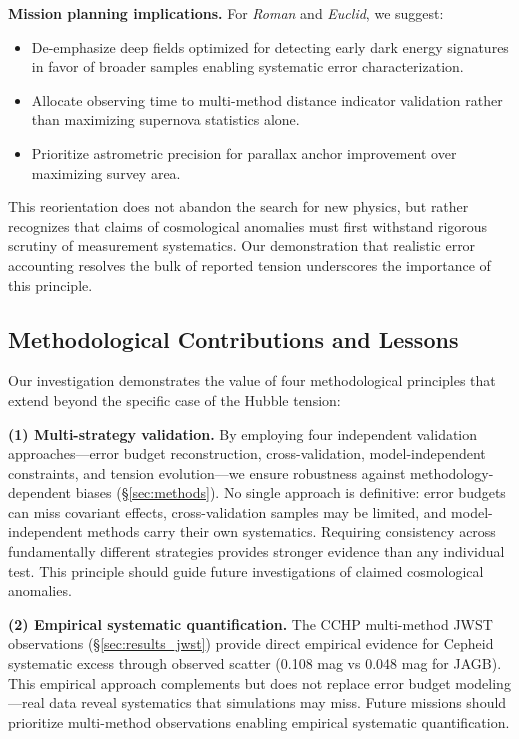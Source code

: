 \documentclass[twocolumn, linenumbers]{aastex701}
\begin{document}
\textbf{Mission planning implications.} For \textit{Roman} and \textit{Euclid}, we suggest:
\begin{itemize}
\item De-emphasize deep fields optimized for detecting early dark energy signatures in favor of broader samples enabling systematic error characterization.
\item Allocate observing time to multi-method distance indicator validation rather than maximizing supernova statistics alone.
\item Prioritize astrometric precision for parallax anchor improvement over maximizing survey area.
\end{itemize}

This reorientation does not abandon the search for new physics, but rather recognizes that claims of cosmological anomalies must first withstand rigorous scrutiny of measurement systematics. Our demonstration that realistic error accounting resolves the bulk of reported tension underscores the importance of this principle.

\subsection{Methodological Contributions and Lessons}

Our investigation demonstrates the value of four methodological principles that extend beyond the specific case of the Hubble tension:

\textbf{(1) Multi-strategy validation.} By employing four independent validation approaches---error budget reconstruction, cross-validation, model-independent constraints, and tension evolution---we ensure robustness against methodology-dependent biases (\S\ref{sec:methods}). No single approach is definitive: error budgets can miss covariant effects, cross-validation samples may be limited, and model-independent methods carry their own systematics. Requiring consistency across fundamentally different strategies provides stronger evidence than any individual test. This principle should guide future investigations of claimed cosmological anomalies.

\textbf{(2) Empirical systematic quantification.} The CCHP multi-method JWST observations (\S\ref{sec:results_jwst}) provide direct empirical evidence for Cepheid systematic excess through observed scatter (0.108 mag vs 0.048 mag for JAGB). This empirical approach complements but does not replace error budget modeling---real data reveal systematics that simulations may miss. Future missions should prioritize multi-method observations enabling empirical systematic quantification.
\end{document}
